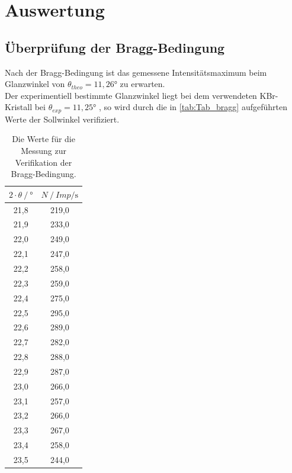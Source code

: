 \section{Auswertung}
\label{sec:Auswertung}



\subsection{Überprüfung der Bragg-Bedingung}
\label{subsec:bragg}
Nach der Bragg-Bedingung ist das gemessene Intensitätsmaximum beim Glanzwinkel von $\theta_{theo} = 11,26°$ zu erwarten. \\
Der experimentiell bestimmte Glanzwinkel liegt bei dem verwendeten KBr-Kristall bei $\theta_{exp}=11,25°$ , so wird durch die in \autoref{tab:Tab_bragg} aufgeführten Werte 
der Sollwinkel verifiziert. \\

\begin{table}[H]
  \centering
  \caption{Die Werte für die Messung zur Verifikation der Bragg-Bedingung.}
  \begin{tabular}{cc}
    \toprule
    {$ 2 \cdot \theta \mathbin{/} \unit{\degree}$} &
    {$ N \mathbin{/} Imp / \unit{\second}$} \\
    \midrule
    21,8 &  219,0 \\
    21,9 &  233,0 \\
    22,0 &  249,0 \\
    22,1 &  247,0 \\
    22,2 &  258,0 \\
    22,3 &  259,0 \\
    22,4 &  275,0 \\
    22,5 &  295,0 \\
    22,6 &  289,0 \\
    22,7 &  282,0 \\
    22,8 &  288,0 \\
    22,9 &  287,0 \\
    23,0 &  266,0 \\
    23,1 &  257,0 \\
    23,2 &  266,0 \\
    23,3 &  267,0 \\
    23,4 &  258,0 \\
    23,5 &  244,0 \\


    \bottomrule
  \end{tabular}
  \label{tab:Tab_bragg}
\end{table}




